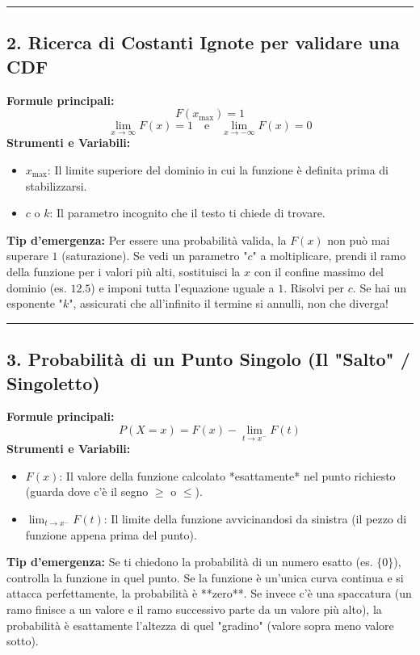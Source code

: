 \documentclass[12pt, a4paper]{article}
\begin{document}
\vspace{0.3cm}\hrule\vspace{0.3cm}

\subsection*{2. Ricerca di Costanti Ignote per validare una CDF}
\textbf{Formule principali:}
$$F(x_{\text{max}})=1$$
$$\lim_{x \to \infty} F(x)=1 \quad \text{e} \quad \lim_{x \to -\infty} F(x)=0$$
\textbf{Strumenti e Variabili:}
\begin{itemize}
    \item $x_{\text{max}}$: Il limite superiore del dominio in cui la funzione è definita prima di stabilizzarsi.
    \item $c$ o $k$: Il parametro incognito che il testo ti chiede di trovare.
\end{itemize}
\textbf{Tip d'emergenza:} Per essere una probabilità valida, la $F(x)$ non può mai superare $1$ (saturazione). Se vedi un parametro "$c$" a moltiplicare, prendi il ramo della funzione per i valori più alti, sostituisci la $x$ con il confine massimo del dominio (es. $12.5$) e imponi tutta l'equazione uguale a $1$. Risolvi per $c$. Se hai un esponente "$k$", assicurati che all'infinito il termine si annulli, non che diverga!

\vspace{0.3cm}\hrule\vspace{0.3cm}

\subsection*{3. Probabilità di un Punto Singolo (Il "Salto" / Singoletto)}
\textbf{Formule principali:}
$$P(X=x)=F(x)-\lim_{t \to x^-} F(t)$$
\textbf{Strumenti e Variabili:}
\begin{itemize}
    \item $F(x)$: Il valore della funzione calcolato *esattamente* nel punto richiesto (guarda dove c'è il segno $\ge$ o $\le$).
    \item $\lim_{t \to x^-} F(t)$: Il limite della funzione avvicinandosi da sinistra (il pezzo di funzione appena prima del punto).
\end{itemize}
\textbf{Tip d'emergenza:} Se ti chiedono la probabilità di un numero esatto (es. $\{0\}$), controlla la funzione in quel punto. Se la funzione è un'unica curva continua e si attacca perfettamente, la probabilità è **zero**. Se invece c'è una spaccatura (un ramo finisce a un valore e il ramo successivo parte da un valore più alto), la probabilità è esattamente l'altezza di quel "gradino" (valore sopra meno valore sotto).
\end{document}
